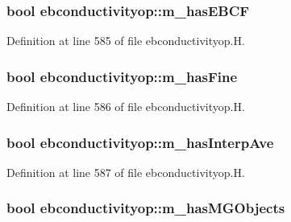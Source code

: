 \subsubsection[{\texorpdfstring{m\+\_\+has\+E\+B\+CF}{m_hasEBCF}}]{\setlength{\rightskip}{0pt plus 5cm}bool ebconductivityop\+::m\+\_\+has\+E\+B\+CF\hspace{0.3cm}{\ttfamily [protected]}}\hypertarget{classebconductivityop_a81c48a80f60209d8971f0c5072033f7c}{}\label{classebconductivityop_a81c48a80f60209d8971f0c5072033f7c}


Definition at line 585 of file ebconductivityop.\+H.

\subsubsection[{\texorpdfstring{m\+\_\+has\+Fine}{m_hasFine}}]{\setlength{\rightskip}{0pt plus 5cm}bool ebconductivityop\+::m\+\_\+has\+Fine\hspace{0.3cm}{\ttfamily [protected]}}\hypertarget{classebconductivityop_aeaf671beb896557adea42082b5b46ffe}{}\label{classebconductivityop_aeaf671beb896557adea42082b5b46ffe}


Definition at line 586 of file ebconductivityop.\+H.

\subsubsection[{\texorpdfstring{m\+\_\+has\+Interp\+Ave}{m_hasInterpAve}}]{\setlength{\rightskip}{0pt plus 5cm}bool ebconductivityop\+::m\+\_\+has\+Interp\+Ave\hspace{0.3cm}{\ttfamily [protected]}}\hypertarget{classebconductivityop_a29aa51762dec1f0d65ba9d1695c2c86c}{}\label{classebconductivityop_a29aa51762dec1f0d65ba9d1695c2c86c}


Definition at line 587 of file ebconductivityop.\+H.

\subsubsection[{\texorpdfstring{m\+\_\+has\+M\+G\+Objects}{m_hasMGObjects}}]{\setlength{\rightskip}{0pt plus 5cm}bool ebconductivityop\+::m\+\_\+has\+M\+G\+Objects\hspace{0.3cm}{\ttfamily [protected]}}\hypertarget{classebconductivityop_a6a5617d49ef517035f5810554509e1b7}{}\label{classebconductivityop_a6a5617d49ef517035f5810554509e1b7}


